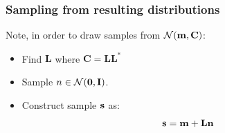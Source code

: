 \documentclass[
  pdf,
  10pt,
  xcolor={svgnames},
]{beamer}
\newcommand{\mc}[1]{\mathcal{#1}}
\newcommand{\mat}[1]{\mathbf{{#1}}}
\begin{document}
\begin{frame}
  \frametitle{Sampling from resulting distributions}
  Note, in order to draw samples from $\mc{N}(\vb{m}, \mat{C})$:
  \begin{itemize}
    \item Find $\mat{L}$ where $\mat{C} = \mat{L} \mat{L}^*$
    \item Sample $n \in \mc{N}(\vb{0}, \mat{I})$.
    \item Construct sample $\vb{s}$ as:
      \[
        \vb{s} = \vb{m} + \mat{L} \vb{n}
      \]
  \end{itemize}
\end{frame}

\end{document}
